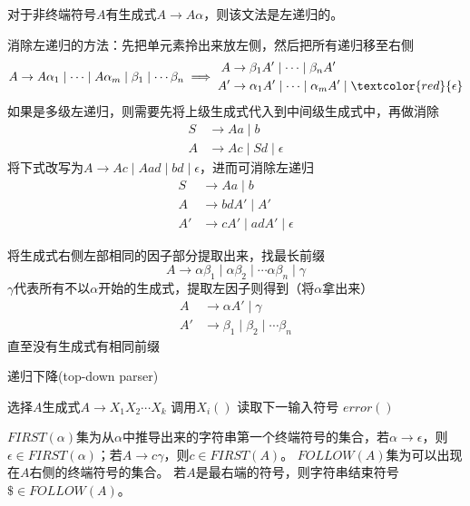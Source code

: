 \begin{definition}[左递归]
对于非终端符号$A$有生成式$A\to A\alpha$，则该文法是左递归的。
\end{definition}
\begin{example}
消除左递归的方法：先把单元素拎出来放左侧，然后把所有递归移至右侧
\[A\to A\alpha_1\mid \cdots\mid A\alpha_m\mid\beta_1\mid\cdots\beta_n
\implies
\begin{aligned}
A &\to\beta_1 A'\mid\cdots\mid\beta_n A'\\
A' &\to\alpha_1 A'\mid\cdots\mid\alpha_m A'\mid\textcolor{red}{\epsilon}
\end{aligned}\]
如果是多级左递归，则需要先将上级生成式代入到中间级生成式中，再做消除
\[\begin{aligned}
S &\to Aa\mid b\\
A &\to Ac\mid Sd\mid \epsilon
\end{aligned}\]
将下式改写为$A \to Ac\mid Aad\mid bd\mid \epsilon$，进而可消除左递归
\[\begin{aligned}
S &\to Aa\mid b\\
A &\to bdA'\mid A'\\
A' &\to cA'\mid adA'\mid \epsilon
\end{aligned}\]
\end{example}

\begin{definition}
将生成式右侧左部相同的因子部分提取出来，找最长前缀
\[A\to\alpha\beta_1\mid\alpha\beta_2\mid\cdots\alpha\beta_n\mid\gamma\]
$\gamma$代表所有不以$\alpha$开始的生成式，提取左因子则得到（将$\alpha$拿出来）
\[\begin{aligned}
A &\to \alpha A'\mid\gamma\\
A' &\to \beta_1\mid\beta_2\mid\cdots\beta_n
\end{aligned}\]
直至没有生成式有相同前缀
\end{definition}

\begin{algorithm}[H]
\centering
\caption{递归下降(top-down parser)}
\begin{algorithmic}[1]
\State 选择$A$生成式$A\to X_1X_2\cdots X_k$
\State 调用$X_i()$
\Else{}
\State 读取下一输入符号
\Else
\State $error()$
\EndIf
\EndIf
\EndFor
\end{algorithmic}
\end{algorithm}

\begin{definition}[FIRST集与FOLLOW集]
$FIRST(\alpha)$集为从$\alpha$中推导出来的字符串第一个终端符号的集合，若$\alpha\to\epsilon$，则$\epsilon\in FIRST(\alpha)$；若$A\to c\gamma$，则$c\in FIRST(A)$。
$FOLLOW(A)$集为可以出现在$A$右侧的终端符号的集合。
若$A$是最右端的符号，则字符串结束符号$\$\in FOLLOW(A)$。
\end{definition}

